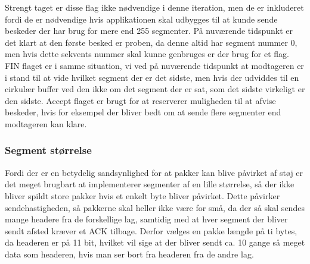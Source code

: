 Strengt taget er disse flag ikke nødvendige i denne iteration, men de er inkluderet fordi de er nødvendige hvis applikationen skal udbygges til at kunde sende beskeder der har brug for mere end 255 segmenter. På nuværende tidspunkt er det klart at den første besked er proben, da denne altid har segment nummer 0, men hvis dette sekvents nummer skal kunne genbruges er der brug for et flag. FIN flaget er i samme situation, vi ved på nuværende tidspunkt at modtageren er i stand til at vide hvilket segment der er det sidste, men hvis der udviddes til en cirkulær buffer ved den ikke om det segment der er sat, som det sidste virkeligt er den sidste. Accept flaget er brugt for at reserverer muligheden til at afvise beskeder, hvis for eksempel der bliver bedt om at sende flere segmenter end modtageren kan klare.
\\
\subsubsection{Segment størrelse}

Fordi der er en betydelig sandsynlighed for at pakker kan blive påvirket af støj er det meget brugbart at implementerer segmenter af en lille størrelse, så der ikke bliver spildt store pakker hvis et enkelt byte bliver påvirket. Dette påvirker sendehastigheden, så pakkerne skal heller ikke være for små, da der så skal sendes mange headere fra de forskellige lag, samtidig med at hver segment der bliver sendt afsted kræver et ACK tilbage. Derfor vælges en pakke længde på ti bytes, da headeren er på 11 bit, hvilket vil sige at der bliver sendt ca. 10 gange så meget data som headeren, hvis man ser bort fra headeren fra de andre lag.
\\
